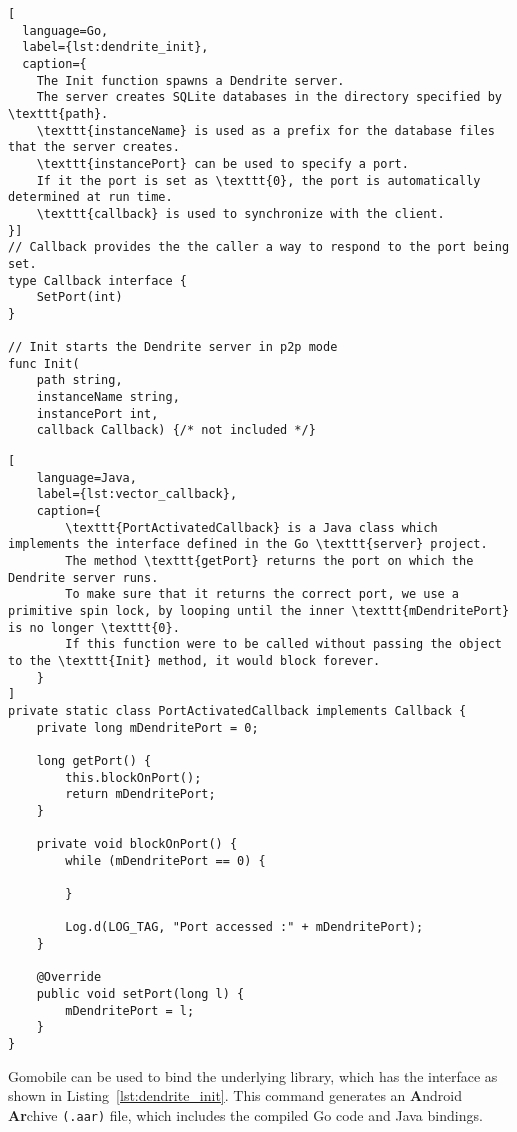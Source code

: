\begin{lstfloat}
	\begin{lstlisting}[
  language=Go,
  label={lst:dendrite_init},
  caption={
    The Init function spawns a Dendrite server.
    The server creates SQLite databases in the directory specified by \texttt{path}.
    \texttt{instanceName} is used as a prefix for the database files that the server creates.
    \texttt{instancePort} can be used to specify a port.
    If it the port is set as \texttt{0}, the port is automatically determined at run time.
    \texttt{callback} is used to synchronize with the client.
}]
// Callback provides the the caller a way to respond to the port being set.
type Callback interface {
	SetPort(int)
}

// Init starts the Dendrite server in p2p mode
func Init(
    path string, 
    instanceName string, 
    instancePort int, 
    callback Callback) {/* not included */}
\end{lstlisting}
\end{lstfloat}


\begin{lstfloat}
	\begin{lstlisting}[
    language=Java,
    label={lst:vector_callback},
    caption={
        \texttt{PortActivatedCallback} is a Java class which implements the interface defined in the Go \texttt{server} project.
        The method \texttt{getPort} returns the port on which the Dendrite server runs.
        To make sure that it returns the correct port, we use a primitive spin lock, by looping until the inner \texttt{mDendritePort} is no longer \texttt{0}.
        If this function were to be called without passing the object to the \texttt{Init} method, it would block forever.
    }
]
private static class PortActivatedCallback implements Callback {
    private long mDendritePort = 0;

    long getPort() {
        this.blockOnPort();
        return mDendritePort;
    }

    private void blockOnPort() {
        while (mDendritePort == 0) {

        }

        Log.d(LOG_TAG, "Port accessed :" + mDendritePort);
    }

    @Override
    public void setPort(long l) {
        mDendritePort = l;
    }
}
\end{lstlisting}
\end{lstfloat}

Gomobile can be used to bind the underlying library, which has the interface as shown in Listing~\ref{lst:dendrite_init}.
This command generates an \textbf{A}ndroid \textbf{Ar}chive \texttt{(.aar)} file\footnotemark, which includes the compiled Go code and Java bindings.

